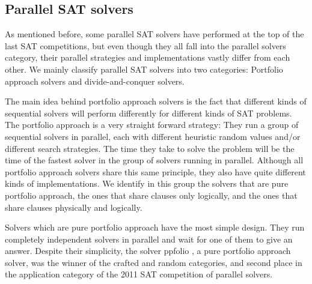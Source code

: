 \documentclass[12pt]{diicc}
\begin{document}
\subsection{Parallel SAT solvers}

As mentioned before, some parallel SAT solvers have performed at the top of the last SAT competitions, but even though they all fall into the parallel solvers category, their parallel strategies and implementations vastly differ from each other. We mainly classify parallel SAT solvers into two categories: Portfolio approach solvers and divide-and-conquer solvers.

The main idea behind portfolio approach solvers is the fact that different kinds of sequential solvers will perform differently for different kinds of SAT problems. The portfolio approach is a very straight forward strategy: They run a group of sequential solvers in parallel, each with different heuristic random values and/or different search strategies. The time they take to solve the problem will be the time of the fastest solver in the group of solvers running in parallel. Although all portfolio approach solvers share this same principle, they also have quite different kinds of implementations. We identify in this group the solvers that are pure portfolio approach, the ones that share clauses only logically, and the ones that share clauses physically and logically.

Solvers which are pure portfolio approach have the most simple design. They run completely independent solvers in parallel and wait for one of them to give an answer. Despite their simplicity, the solver ppfolio \cite{ppfolio}, a pure portfolio approach solver, was the winner of the crafted and random categories, and second place in the application category of the 2011 SAT competition of parallel solvers. 
\end{document}
